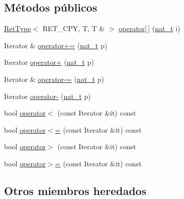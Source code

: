 \subsection*{Métodos públicos}
\begin{DoxyCompactItemize}
\item 
\hyperlink{namespace_designar_ab937f9c4bf5f1d0e65dbc616245d50ee}{Ret\+Type}$<$ R\+E\+T\+\_\+\+C\+PY, T, T \& $>$ \hyperlink{class_designar_1_1_random_access_iterator_a19e24a37b546cb41aed275ff61fbc0b7}{operator\mbox{[}$\,$\mbox{]}} (\hyperlink{namespace_designar_aa72662848b9f4815e7bf31a7cf3e33d1}{nat\+\_\+t} i)
\item 
Iterator \& \hyperlink{class_designar_1_1_random_access_iterator_aad12a146046f6463476453b3aac61359}{operator+=} (\hyperlink{namespace_designar_aa72662848b9f4815e7bf31a7cf3e33d1}{nat\+\_\+t} p)
\item 
Iterator \hyperlink{class_designar_1_1_random_access_iterator_af5b2b9cab5cf3ac48cbc712c24f02c97}{operator+} (\hyperlink{namespace_designar_aa72662848b9f4815e7bf31a7cf3e33d1}{nat\+\_\+t} p)
\item 
Iterator \& \hyperlink{class_designar_1_1_random_access_iterator_ac7ede306e0004e8c178059ede8e239ba}{operator-\/=} (\hyperlink{namespace_designar_aa72662848b9f4815e7bf31a7cf3e33d1}{nat\+\_\+t} p)
\item 
Iterator \hyperlink{class_designar_1_1_random_access_iterator_ab59d5341ccba07c66bf2f6a904d5a6c1}{operator-\/} (\hyperlink{namespace_designar_aa72662848b9f4815e7bf31a7cf3e33d1}{nat\+\_\+t} p)
\item 
bool \hyperlink{class_designar_1_1_random_access_iterator_ad37f72e55f884ad8f41d4426f2e34d01}{operator$<$} (const Iterator \&it) const
\item 
bool \hyperlink{class_designar_1_1_random_access_iterator_a1e3696df89803b90124dae7b648bd875}{operator$<$=} (const Iterator \&it) const
\item 
bool \hyperlink{class_designar_1_1_random_access_iterator_a4d72737c88579cc302bc91d3520150fa}{operator$>$} (const Iterator \&it) const
\item 
bool \hyperlink{class_designar_1_1_random_access_iterator_a38642462d4d39e78533715d41e949a6a}{operator$>$=} (const Iterator \&it) const
\end{DoxyCompactItemize}
\subsection*{Otros miembros heredados}


